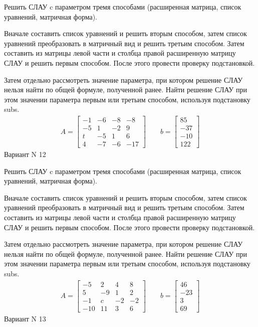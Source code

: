 \documentclass[11pt]{report}
\begin{document}
Решить СЛАУ c параметром тремя способами (расширенная матрица, список уравнений, матричная форма).

Вначале составить список уравнений и решить вторым способом,
затем список уравнений преобразовать в матричный вид и решить третьим способом.
Затем составить из матрицы левой части и столбца правой расширенную матрицу СЛАУ и решить первым способом.
После этого провести проверку подстановкой.

Затем отдельно рассмотреть значение параметра, при котором решение СЛАУ нельзя найти по общей формуле,
полученной ранее.
Найти решение СЛАУ при этом значении параметра первым или третьим способом, используя подстановку subs.
\begin{align*}
    A = \left[\begin{matrix}-1 & -6 & -8 & -8\\-5 & 1 & -2 & 9\\t & -5 & 1 & 6\\4 & -7 & -6 & -17\end{matrix}\right]
\qquad b = \left[\begin{matrix}85\\-37\\-10\\122\end{matrix}\right]
\end{align*}
\newpage
Вариант N 12


Решить СЛАУ c параметром тремя способами (расширенная матрица, список уравнений, матричная форма).

Вначале составить список уравнений и решить вторым способом,
затем список уравнений преобразовать в матричный вид и решить третьим способом.
Затем составить из матрицы левой части и столбца правой расширенную матрицу СЛАУ и решить первым способом.
После этого провести проверку подстановкой.

Затем отдельно рассмотреть значение параметра, при котором решение СЛАУ нельзя найти по общей формуле,
полученной ранее.
Найти решение СЛАУ при этом значении параметра первым или третьим способом, используя подстановку subs.
\begin{align*}
    A = \left[\begin{matrix}-5 & 2 & 4 & 8\\5 & -9 & 1 & 2\\-1 & c & -2 & -2\\-10 & 11 & 3 & 6\end{matrix}\right]
\qquad b = \left[\begin{matrix}46\\-23\\3\\69\end{matrix}\right]
\end{align*}
\newpage
Вариант N 13
\end{document}
